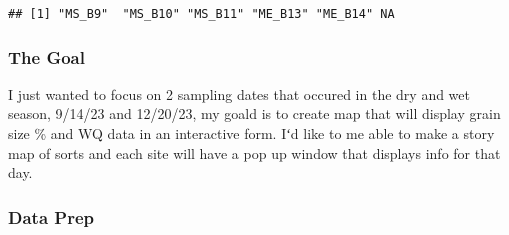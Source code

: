 \documentclass[
]{article}
\begin{document}
\begin{verbatim}
## [1] "MS_B9"  "MS_B10" "MS_B11" "ME_B13" "ME_B14" NA
\end{verbatim}

\subsubsection{The Goal}\label{the-goal}

I just wanted to focus on 2 sampling dates that occured in the dry and
wet season, 9/14/23 and 12/20/23, my goald is to create map that will
display grain size \% and WQ data in an interactive form. Iʻd like to me
able to make a story map of sorts and each site will have a pop up
window that displays info for that day.

\subsubsection{Data Prep}\label{data-prep}
\end{document}
